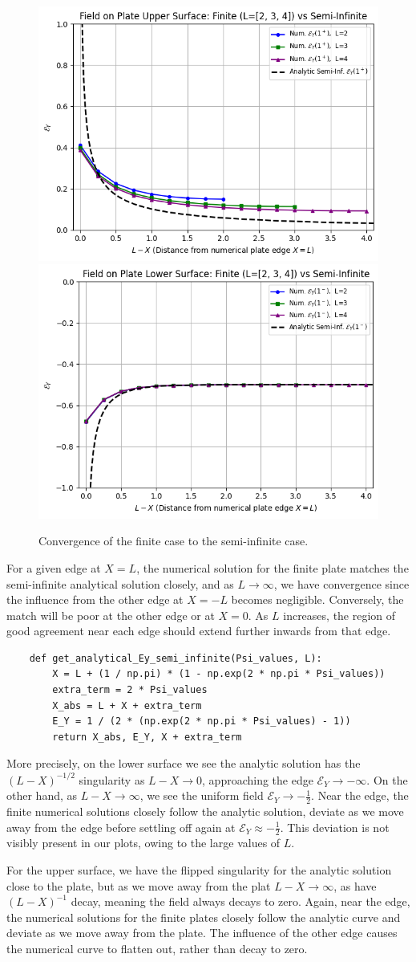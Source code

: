 \documentclass{article}
\begin{document}
\begin{figure}
    \centering
    \includegraphics[width=0.49\linewidth]{images/semiinf1.png}
    \includegraphics[width=0.49\linewidth]{images/semiinf2.png}
    \caption{Convergence of the finite case to the semi-infinite case.}
\end{figure}

For a given edge at \(X = L\), the numerical solution for the finite plate matches the semi-infinite analytical solution closely, and as \(L \to  \infty\), we have convergence since the influence from the other edge at \(X = -L\) becomes negligible. Conversely, the match will be poor at the other edge or at \(X = 0\). As \(L\) increases, the region of good agreement near each edge should extend further inwards from that edge.

\begin{verbatim}
    def get_analytical_Ey_semi_infinite(Psi_values, L):
        X = L + (1 / np.pi) * (1 - np.exp(2 * np.pi * Psi_values)) 
        extra_term = 2 * Psi_values
        X_abs = L + X + extra_term
        E_Y = 1 / (2 * (np.exp(2 * np.pi * Psi_values) - 1))
        return X_abs, E_Y, X + extra_term
\end{verbatim}

More precisely, on the lower surface we see the analytic solution has the \((L-X)^{-1/2}\) singularity as \(L-X \to 0\), approaching the edge \(\mathcal{E}_Y \to -\infty\). On the other hand, as \(L-X \to \infty\), we see the uniform field \(\mathcal{E}_Y \to -\frac{1}{2}\). Near the edge, the finite numerical solutions closely follow the analytic solution, deviate as we move away from the edge before settling off again at \(\mathcal{E}_Y \approx -\frac{1}{2}\). This deviation is not visibly present in our plots, owing to the large values of \(L\).

For the upper surface, we have the flipped singularity for the analytic solution close to the plate, but as we move away from the plat \(L-X \to \infty\), as have \((L-X)^{-1}\) decay, meaning the field always decays to zero. Again, near the edge, the numerical solutions for the finite plates closely follow the analytic curve and deviate as we move away from the plate. The influence of the other edge causes the numerical curve to flatten out, rather than decay to zero.
\end{document}
